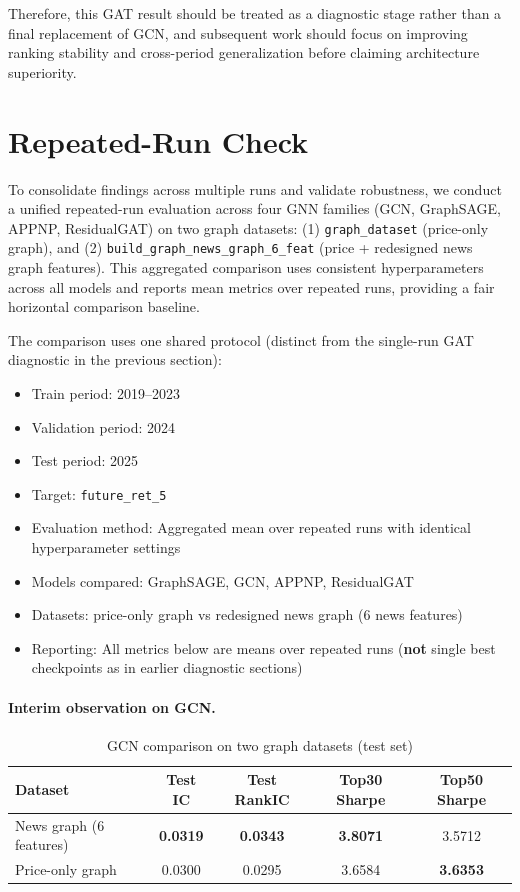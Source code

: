 Therefore, this GAT result should be treated as a diagnostic stage rather than a final replacement of GCN, and subsequent work should focus on improving ranking stability and cross-period generalization before claiming architecture superiority.

\section{Repeated-Run Check}\label{sec:repeated-run-check}

To consolidate findings across multiple runs and validate robustness, we conduct a unified repeated-run evaluation across four GNN families (GCN, GraphSAGE, APPNP, ResidualGAT) on two graph datasets: (1) \texttt{graph\_dataset} (price-only graph), and (2) \texttt{build\_graph\_news\_graph\_6\_feat} (price + redesigned news graph features). This aggregated comparison uses consistent hyperparameters across all models and reports mean metrics over repeated runs, providing a fair horizontal comparison baseline.

The comparison uses one shared protocol (distinct from the single-run GAT diagnostic in the previous section):
\begin{itemize}
\item Train period: 2019--2023
\item Validation period: 2024
\item Test period: 2025
\item Target: \texttt{future\_ret\_5}
\item Evaluation method: Aggregated mean over repeated runs with identical hyperparameter settings
\item Models compared: GraphSAGE, GCN, APPNP, ResidualGAT
\item Datasets: price-only graph vs redesigned news graph (6 news features)
\item Reporting: All metrics below are means over repeated runs (\textbf{not} single best checkpoints as in earlier diagnostic sections)
\end{itemize}

\paragraph{Interim observation on GCN.}

\begin{table}[htbp]
\centering
\caption{GCN comparison on two graph datasets (test set)}
\label{tab:gcn-final-two-datasets}
\begin{tabular}{lcccc}
\hline
Dataset & Test IC & Test RankIC & Top30 Sharpe & Top50 Sharpe \\
\hline
News graph (6 features) & \textbf{0.0319} & \textbf{0.0343} & \textbf{3.8071} & 3.5712 \\
Price-only graph & 0.0300 & 0.0295 & 3.6584 & \textbf{3.6353} \\
\hline
\end{tabular}
\end{table}

